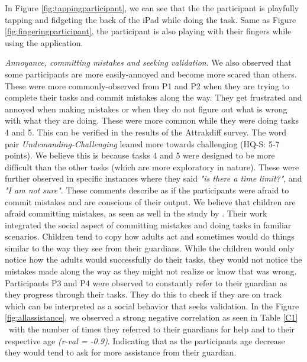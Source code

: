 In Figure \ref{fig:tappingparticipant}, we can see that the the participant is playfully tapping and fidgeting the back of the iPad while doing the task. Same as Figure \ref{fig:fingeringparticipant}, the participant is also playing with their fingers while using the application.

\textit{Annoyance, committing mistakes and seeking validation}. We also observed that some participants are more easily-annoyed and become more scared than others. These were more commonly-observed from P1 and P2 when they are trying to complete their tasks and commit mistakes along the way. They get frustrated and annoyed when making mistakes or when they do not figure out what is wrong with what they are doing.  These were more common while they were doing tasks 4 and 5. This can be verified in the results of the Attrakdiff survey. The word pair \textit{Undemanding-Challenging} leaned more towards challenging (HQ-S: 5-7 points). We believe this is because tasks 4 and 5 were designed to be more difficult than the other tasks (which are more exploratory in nature). These were further observed in specific instances where they said \textit{"is there a time limit?"}, and \textit{"I am not sure"}. These comments describe as if the participants were afraid to commit mistakes and are conscious of their output. We believe that children are afraid committing mistakes, as seen as well in the study by \cite{hourcade2015child}. Their work integrated the social aspect of committing mistakes and doing tasks in familiar scenarios. Children tend to copy how adults act and sometimes would do things similar to the way they see from their guardians. While the children would only notice how the adults would successfully do their tasks, they would not notice the mistakes made along the way as they might not realize or know that was wrong. Participants P3 and P4 were observed to constantly refer to their guardian as they progress through their tasks. They do this to check if they are on track which can be interpreted as a social behavior that seeks validation. In the Figure \ref{fig:allassistance}, we observed a strong negative correlation as seen in Table \ref{C1} \ with the number of times they referred to their guardians for help and to their respective age \textit{(r-val = -0.9)}. Indicating that as the participants age decrease they would tend to ask for more assistance from their guardian.


